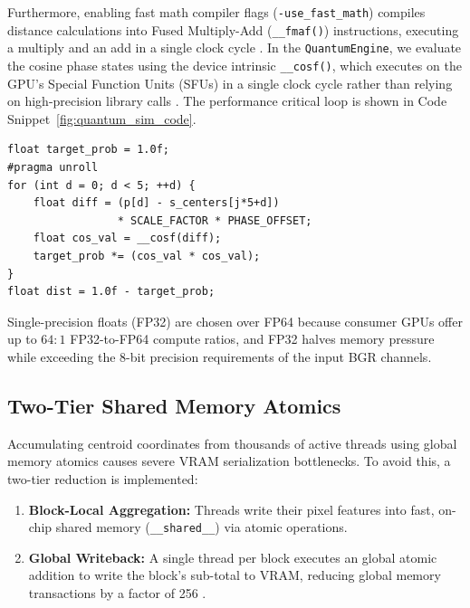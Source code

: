Furthermore, enabling fast math compiler flags (\texttt{-use\_fast\_math}) compiles distance calculations into Fused Multiply-Add (\texttt{\_\_fmaf()}) instructions, executing a multiply and an add in a single clock cycle \cite{CudaGuide}. In the \texttt{QuantumEngine}, we evaluate the cosine phase states using the device intrinsic \texttt{\_\_cosf()}, which executes on the GPU's Special Function Units (SFUs) in a single clock cycle rather than relying on high-precision library calls \cite{cppreference_cos, CudaGuide}. The performance critical loop is shown in Code Snippet~\ref{fig:quantum_sim_code}.

\begin{lstlisting}[float=b, basicstyle=\small\ttfamily, breaklines=true, columns=flexible, frame=single, framextopmargin=3pt, framexbottommargin=3pt, xleftmargin=5pt, xrightmargin=5pt, aboveskip=12pt, belowskip=12pt, captionpos=b, caption={Quantum-inspired phase evaluation in CUDA}, label={fig:quantum_sim_code}]
float target_prob = 1.0f;
#pragma unroll
for (int d = 0; d < 5; ++d) {
    float diff = (p[d] - s_centers[j*5+d])
                 * SCALE_FACTOR * PHASE_OFFSET;
    float cos_val = __cosf(diff);
    target_prob *= (cos_val * cos_val);
}
float dist = 1.0f - target_prob;
\end{lstlisting}

Single-precision floats (FP32) are chosen over FP64 because consumer GPUs offer up to $64:1$ FP32-to-FP64 compute ratios, and FP32 halves memory pressure while exceeding the 8-bit precision requirements of the input BGR channels.

\subsection{Two-Tier Shared Memory Atomics}
Accumulating centroid coordinates from thousands of active threads using global memory atomics causes severe VRAM serialization bottlenecks. To avoid this, a two-tier reduction is implemented:
\begin{enumerate}
    \item \textbf{Block-Local Aggregation:} Threads write their pixel features into fast, on-chip shared memory (\texttt{\_\_shared\_\_}) via atomic operations.
    \item \textbf{Global Writeback:} A single thread per block executes an global atomic addition to write the block's sub-total to VRAM, reducing global memory transactions by a factor of 256 \cite{CudaGuide, cook2012cuda}.
\end{enumerate}

